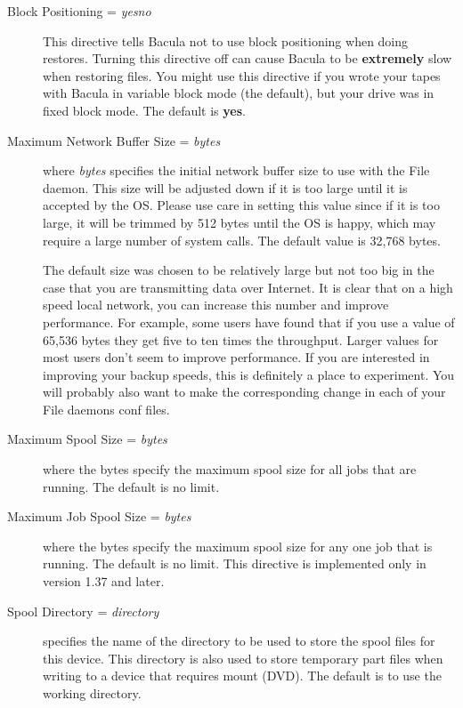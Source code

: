 \begin{description}
\item [Block Positioning = {\it yes\vb{}no}]
   This directive tells Bacula not to use block positioning when doing restores.
   Turning this directive off can cause Bacula to be {\bf extremely} slow
   when restoring files.  You might use this directive if you wrote your
   tapes with Bacula in variable block mode (the default), but your drive
   was in fixed block mode. The default is {\bf yes}.

\item [Maximum Network Buffer Size = {\it bytes}]
   where {\it bytes} specifies the initial network buffer  size to use with the
   File daemon.  This size will be adjusted down if it is too large until
   it is accepted by the OS. Please use care in setting this value since if
   it is too large, it will be trimmed by 512 bytes until the OS is happy,
   which may require a large number of system calls.  The default value is
   32,768 bytes.

   The default size was chosen to be relatively large but not too big in
   the case that you are transmitting data over Internet.  It is clear that
   on a high speed local network, you can increase this number and improve
   performance. For example, some users have found that if you use a value
   of 65,536 bytes they get five to ten times the throughput.  Larger values for
   most users don't seem to improve performance. If you are interested
   in improving your backup speeds, this is definitely a place to
   experiment. You will probably also want to make the corresponding change
   in each of your File daemons conf files.


\item [Maximum Spool Size = {\it bytes}]
   where the bytes specify the maximum spool size for all jobs that are
   running.  The default is no limit.

\item [Maximum Job Spool Size = {\it bytes}]
   where the bytes specify the maximum spool size for any one job  that is
   running. The default is no limit. 
   This directive is implemented only in version 1.37 and later.

\item [Spool Directory = {\it directory}]
   specifies the name of the directory to be used to store  the spool files for
   this device. This directory is also used to store  temporary part files when
   writing to a device that requires mount (DVD).  The default is to use the
   working directory. 


\end{description}
